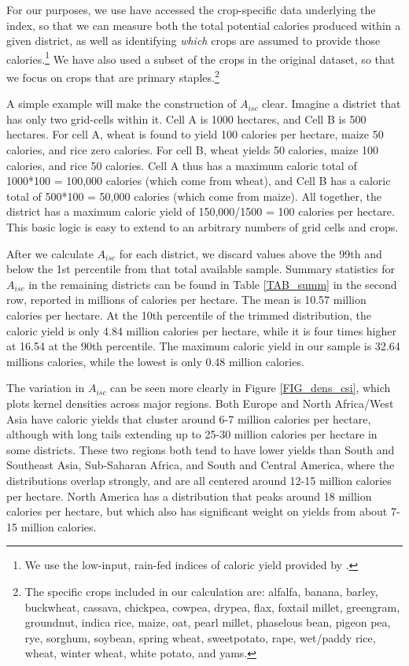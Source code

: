 \documentclass[11pt]{article}
\begin{document}
For our purposes, we use have accessed the crop-specific data underlying the \citet{galorozak2016} index, so that we can measure both the total potential calories produced within a given district, as well as identifying \textit{which} crops are assumed to provide those calories.\footnote{We use the low-input, rain-fed indices of caloric yield provided by \citet{galorozak2016}.} We have also used a subset of the crops in the original \citet{galorozak2016} dataset, so that we focus on crops that are primary staples.\footnote{The specific crops included in our calculation are: alfalfa, banana, barley, buckwheat, cassava, chickpea, cowpea, drypea, flax, foxtail millet, greengram, groundnut, indica rice, maize, oat, pearl millet, phaselous bean, pigeon pea, rye, sorghum, soybean, spring wheat, sweetpotato, rape, wet/paddy rice, wheat, winter wheat, white potato, and yams.} 

A simple example will make the construction of $A_{isc}$ clear. Imagine a district that has only two grid-cells within it. Cell A is 1000 hectares, and Cell B is 500 hectares. For cell A, wheat is found to yield 100 calories per hectare, maize 50 calories, and rice zero calories. For cell B, wheat yields 50 calories, maize 100 calories, and rice 50 calories. Cell A thus has a maximum caloric total of 1000*100 = 100,000 calories (which come from wheat), and Cell B has a caloric total of 500*100 = 50,000 calories (which come from maize). All together, the district has a maximum caloric yield of 150,000/1500 = 100 calories per hectare. This basic logic is easy to extend to an arbitrary numbers of grid cells and crops.

After we calculate $A_{isc}$ for each district, we discard values above the 99th and below the 1st percentile from that total available sample. Summary statistics for $A_{isc}$ in the remaining districts can be found in Table \ref{TAB_summ} in the second row, reported in millions of calories per hectare. The mean is 10.57 million calories per hectare. At the 10th percentile of the trimmed distribution, the caloric yield is only 4.84 million calories per hectare, while it is four times higher at 16.54 at the 90th percentile. The maximum caloric yield in our sample is 32.64 millions calories, while the lowest is only 0.48 million calories. 

The variation in $A_{isc}$ can be seen more clearly in Figure \ref{FIG_dens_csi}, which plots kernel densities across major regions. Both Europe and North Africa/West Asia have caloric yields that cluster around 6-7 million calories per hectare, although with long tails extending up to 25-30 million calories per hectare in some districts. These two regions both tend to have lower yields than South and Southeast Asia, Sub-Saharan Africa, and South and Central America, where the distributions overlap strongly, and are all centered around 12-15 million calories per hectare. North America has a distribution that peaks around 18 million calories per hectare, but which also has significant weight on yields from about 7-15 million calories. 
\end{document}
